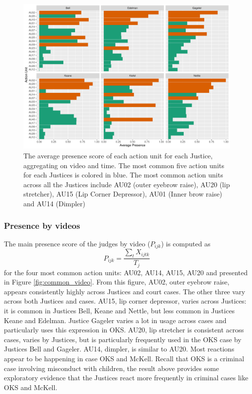 \documentclass{monashthesis}
\begin{document}
\begin{figure}

{\centering \includegraphics[width=1\linewidth]{figures/most-common-1} 

}

\caption{The average presence score of each action unit for each Justice, aggregating on video and time. The most common five action units for each Justices is colored in blue. The most common action units across all the Justices include AU02 (outer eyebrow raise), AU20 (lip stretcher), AU15 (Lip Corner Depressor), AU01 (Inner brow raise) and AU14 (Dimpler) \label{fig:mean_presence}}\label{fig:most-common}
\end{figure}

\hypertarget{presence-by-videos}{%
\subsubsection{Presence by videos}\label{presence-by-videos}}

The main presence score of the judges by video (\(P_{ijk}\)) is computed as \[P_{ijk} = \frac{\sum_{t}X_{ijtk}}{T_j}\] for the four most common action units: AU02, AU14, AU15, AU20 and presented in Figure \ref{fig:common_video}. From this figure, AU02, outer eyebrow raise, appears consistently highly across Justices and court cases. The other three vary across both Justices and cases. AU15, lip corner depressor, varies across Justices: it is common in Justices Bell, Keane and Nettle, but less common in Justices Keane and Edelman. Justice Gageler varies a lot in usage across cases and particularly uses this expression in OKS. AU20, lip stretcher is consistent across cases, varies by Justices, but is particularly frequently used in the OKS case by Justices Bell and Gageler. AU14, dimpler, is similar to AU20. Most reactions appear to be happening in case OKS and McKell. Recall that OKS is a criminal case involving misconduct with children, the result above provides some exploratory evidence that the Justices react more frequently in criminal cases like OKS and McKell.
\end{document}
